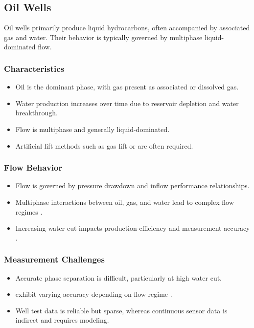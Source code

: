 \documentclass[12pt,APA]{uomthesis}
\begin{document}
\subsection{Oil Wells}
Oil wells primarily produce liquid hydrocarbons, often accompanied by associated gas and water. Their behavior is typically governed by multiphase liquid-dominated flow.

\subsubsection{Characteristics}
\begin{itemize}
\item Oil is the dominant phase, with gas present as associated or dissolved gas.
\item Water production increases over time due to reservoir depletion and water breakthrough.
\item Flow is multiphase and generally liquid-dominated.
\item Artificial lift methods such as gas lift or  are often required.
\end{itemize}

\subsubsection{Flow Behavior}
\begin{itemize}
\item Flow is governed by pressure drawdown and inflow performance relationships.
\item Multiphase interactions between oil, gas, and water lead to complex flow regimes \citep{brill1999multiphase}.
\item Increasing water cut impacts production efficiency and measurement accuracy \citep{falcone2009multiphase}.
\end{itemize}

\subsubsection{Measurement Challenges}
\begin{itemize}
\item Accurate phase separation is difficult, particularly at high water cut.
\item {} exhibit varying accuracy depending on flow regime \citep{falcone2009multiphase}.
\item Well test data is reliable but sparse, whereas continuous sensor data is indirect and requires modeling.
\end{itemize}
\end{document}
